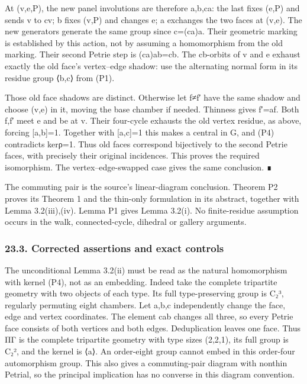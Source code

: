 \documentclass[
  10pt,
  letterpaper,
]{article}
\begin{document}
At (v,e,P), the new panel involutions are therefore a,b,ca: the last
fixes (e,P) and sends v to cv; b fixes (v,P) and changes e; a exchanges
the two faces at (v,e). The new generators generate the same group since
c=(ca)a. Their geometric marking is established by this action, not by
assuming a homomorphism from the old marking. Their second Petrie step
is (ca)ab=cb. The cb-orbits of v and e exhaust exactly the old face's
vertex--edge shadow: use the alternating normal form in its residue
group ⟨b,c⟩ from (P1).

Those old face shadows are distinct. Otherwise let f≠f′ have the same
shadow and choose (v,e) in it, moving the base chamber if needed.
Thinness gives f′=af. Both f,f′ meet e and be at v. Their four-cycle
exhausts the old vertex residue, as above, forcing {[}a,b{]}=1. Together
with {[}a,c{]}=1 this makes a central in G, and (P4) contradicts kerρ=1.
Thus old faces correspond bijectively to the second Petrie faces, with
precisely their original incidences. This proves the required
isomorphism. The vertex--edge-swapped case gives the same conclusion. ∎

The commuting pair is the source's linear-diagram conclusion. Theorem P2
proves its Theorem 1 and the thin-only formulation in its abstract,
together with Lemma 3.2(iii),(iv). Lemma P1 gives Lemma 3.2(i). No
finite-residue assumption occurs in the walk, connected-cycle, dihedral
or gallery arguments.

\subsubsection{23.3. Corrected assertions and exact
controls}\label{corrected-assertions-and-exact-controls}

The unconditional Lemma 3.2(ii) must be read as the natural homomorphism
with kernel (P4), not as an embedding. Indeed take the complete
tripartite geometry with two objects of each type. Its full
type-preserving group is C₂³, regularly permuting eight chambers. Let
a,b,c independently change the face, edge and vertex coordinates. The
element cab changes all three, so every Petrie face consists of both
vertices and both edges. Deduplication leaves one face. Thus ΠΓ is the
complete tripartite geometry with type sizes (2,2,1), its full group is
C₂², and the kernel is ⟨a⟩. An order-eight group cannot embed in this
order-four automorphism group. This also gives a commuting-pair diagram
with nonthin Petrial, so the principal implication has no converse in
this diagram convention.
\end{document}
